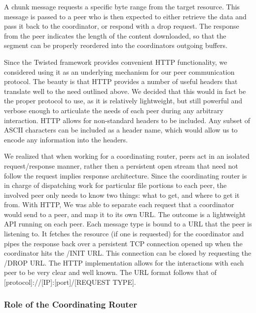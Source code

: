 \documentclass[12pt]{article}
\begin{document}
			A chunk message requests a specific byte range from the target resource. This message is passed to a peer who is then expected to either retrieve the data and pass it back to the coordinator, or respond with a drop request. The response from the peer indicates the length of the content downloaded, so that the segment can be properly reordered into the coordinators outgoing buffers.

			Since the Twisted framework provides convenient HTTP functionality, we considered using it as an underlying mechanism for our peer communication protocol. The beauty is that HTTP provides a number of useful headers that translate well to the need outlined above. We decided that this would in fact be the proper protocol to use, as it is relatively lightweight, but still powerful and verbose enough to articulate the needs of each peer during any arbitrary interaction. HTTP allows for non-standard headers to be included. Any subset of ASCII characters can be included as a header name, which would allow us to encode any information into the headers.

			We realized that when working for a coordinating router, peers act in an isolated request/response manner, rather then a persistent open stream that need not follow the request implies response architecture. Since the coordinating router is in charge of dispatching work for particular file portions to each peer, the involved peer only needs to know two things: what to get, and where to get it from. With HTTP, We was able to separate each request that a coordinator would send to a peer, and map it to its own URL. The outcome is a lightweight API running on each peer. Each message type is bound to a URL that the peer is listening to. It fetches the resource (if one is requested) for the coordinator and pipes the response back over a persistent TCP connection opened up when the coordinator hits the /INIT URL. This connection can be closed by requesting the /DROP URL. The HTTP implementation allows for the interactions with each peer to be very clear and well known. The URL format follows that of [protocol]://[IP]:[port]/[REQUEST TYPE].

		\subsubsection{Role of the Coordinating Router}
\end{document}
